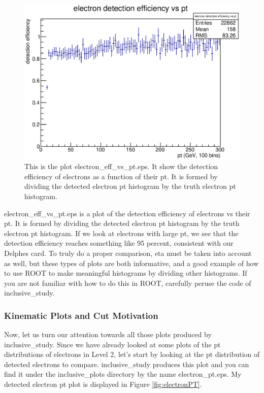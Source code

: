 \documentclass{article}
\begin{document}
\begin{figure}[!htbp]
	\centering
	\includegraphics[width = \linewidth]{electron_eff_vs_pt.eps}
	\caption{This is the plot electron\_eff\_vs\_pt.eps. It show the detection efficiency of electrons as a function of their pt. It is formed by dividing the detected electron pt histogram by the truth electron pt histogram.}
	\label{fig:electronEffvsPT}
\end{figure}

\bigskip

electron\_eff\_vs\_pt.eps is a plot of the detection efficiency of electrons vs their pt. It is formed by dividing
the detected electron pt histogram by the truth electron pt histogram. If we look at electrons with large
pt, we see that the detection efficiency reaches something like 95 percent, consistent with our Delphes
card. To truly do a proper comparison, eta must be taken into account as well, but these types of plots
are both informative, and a good example of how to use ROOT to make meaningful histograms by dividing
other histograms. If you are not familiar with how to do this in ROOT, carefully peruse the code of
inclusive\_study.

\subsubsection{Kinematic Plots and Cut Motivation}

Now, let us turn our attention towards all those plots produced by inclusive\_study. Since we have already looked at some plots
of the pt distributions of electrons in Level 2, let's start by looking at the pt distribution of detected electrons to compare.
inclusive\_study produces this plot and you can find it under the inclusive\_plots directory by the name electron\_pt.eps. My
detected electron pt plot is displayed in Figure \ref{fig:electronPT}.
\end{document}
